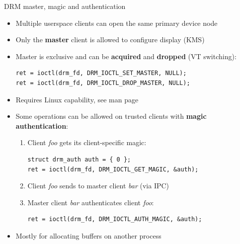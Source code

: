 \begin{frame}[fragile]{DRM master, magic and authentication}
  \begin{itemize}
  \item Multiple userspace clients can open the same primary device node
  \item Only the \textbf{master} client is allowed to configure display (KMS)
  \item Master is exclusive and can be \textbf{acquired} and \textbf{dropped} (VT switching):
  \begin{verbatim}
ret = ioctl(drm_fd, DRM_IOCTL_SET_MASTER, NULL);
ret = ioctl(drm_fd, DRM_IOCTL_DROP_MASTER, NULL);
  \end{verbatim}
  \item Requires  Linux capability, see  man page
  \item Some operations can be allowed on trusted clients with \textbf{magic authentication}:
  \begin{enumerate}
  \item Client \textit{foo} gets its client-specific magic:
  \begin{verbatim}
struct drm_auth auth = { 0 };
ret = ioctl(drm_fd, DRM_IOCTL_GET_MAGIC, &auth);
  \end{verbatim}
  \item Client \textit{foo} sends  to master client \textit{bar} (via IPC)
  \item Master client \textit{bar} authenticates client \textit{foo}:
  \begin{verbatim}
ret = ioctl(drm_fd, DRM_IOCTL_AUTH_MAGIC, &auth);
  \end{verbatim}
  \end{enumerate}
  \item Mostly for allocating buffers on another process
  \end{itemize}
\end{frame}

